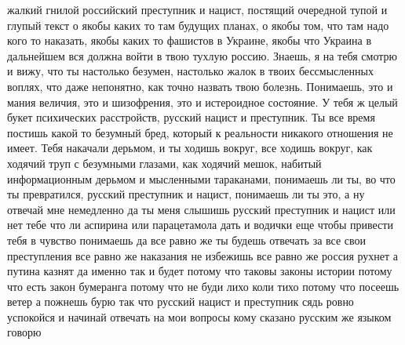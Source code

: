 жалкий гнилой российский преступник и нацист, постящий очередной тупой и глупый
текст о якобы каких то там будущих планах, о якобы том, что там надо кого то
наказать, якобы каких то фашистов в Украине, якобы что Украина в дальнейшем вся
должна войти в твою тухлую россию.  Знаешь, я на тебя смотрю и вижу, что ты
настолько безумен, настолько жалок в твоих бессмысленных воплях, что даже
непонятно, как точно назвать твою болезнь. Понимаешь, это и мания величия, это
и шизофрения, это и истероидное состояние. У тебя ж целый букет психических
расстройств, русский нацист и преступник. Ты все время постишь какой то
безумный бред, который к реальности никакого отношения не имеет. Тебя накачали
дерьмом, и ты ходишь вокруг, все ходишь вокруг, как ходячий труп с безумными
глазами, как ходячий мешок, набитый информационным дерьмом и мысленными
тараканами, понимаешь ли ты, во что ты превратился, русский преступник и
нацист, понимаешь ли ты это, а ну отвечай мне немедленно да ты меня слышишь
русский преступник и нацист или нет тебе что ли аспирина или парацетамола дать
и водички еще чтобы привести тебя в чувство понимаешь да все равно же ты будешь
отвечать за все свои преступления все равно же наказания не избежишь все равно
же россия рухнет а путина казнят да именно так и будет потому что таковы законы
истории потому что есть закон бумеранга потому что не буди лихо коли тихо
потому что посеешь ветер а пожнешь бурю так что русский нацист и преступник
сядь ровно успокойся и начинай отвечать на мои вопросы кому сказано русским же
языком говорю

